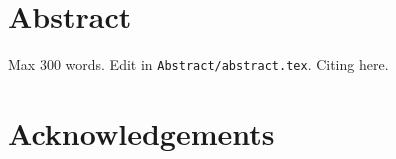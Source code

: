 \clearpage
{
    \pagestyle{abstract}
    \chapter*{Abstract}
    Max 300 words. Edit in \texttt{Abstract/abstract.tex}. Citing \cite{latex-intro} here.
    \thispagestyle{is}
}
\newpage



\clearpage
{
    \pagestyle{acknowledgements}
    \chapter*{Acknowledgements}
    \thispagestyle{acknowledgements}
}
\newpage
